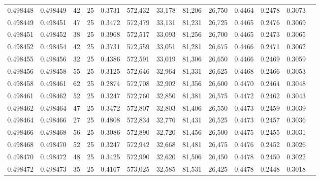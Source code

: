 \begin{tabular}{rrrrrrrrrrrrr}
0.498448 & 0.498449 &    42 &  25 &                                     0.3731 & 572,432 &  33,178 &  81,206 &  26,750 & 0.4464 & 0.2478 & 0.3073 \\
0.498449 & 0.498451 &    47 &  25 &                                     0.3472 & 572,479 &  33,131 &  81,231 &  26,725 & 0.4465 & 0.2476 & 0.3069 \\
0.498451 & 0.498452 &    38 &  25 &                                     0.3968 & 572,517 &  33,093 &  81,256 &  26,700 & 0.4465 & 0.2473 & 0.3065 \\
0.498452 & 0.498454 &    42 &  25 &                                     0.3731 & 572,559 &  33,051 &  81,281 &  26,675 & 0.4466 & 0.2471 & 0.3062 \\
0.498455 & 0.498456 &    32 &  25 &                                     0.4386 & 572,591 &  33,019 &  81,306 &  26,650 & 0.4466 & 0.2469 & 0.3059 \\
0.498456 & 0.498458 &    55 &  25 &                                     0.3125 & 572,646 &  32,964 &  81,331 &  26,625 & 0.4468 & 0.2466 & 0.3053 \\
0.498458 & 0.498461 &    62 &  25 &                                     0.2874 & 572,708 &  32,902 &  81,356 &  26,600 & 0.4470 & 0.2464 & 0.3048 \\
0.498461 & 0.498462 &    52 &  25 &                                     0.3247 & 572,760 &  32,850 &  81,381 &  26,575 & 0.4472 & 0.2462 & 0.3043 \\
0.498462 & 0.498464 &    47 &  25 &                                     0.3472 & 572,807 &  32,803 &  81,406 &  26,550 & 0.4473 & 0.2459 & 0.3039 \\
0.498464 & 0.498466 &    27 &  25 &                                     0.4808 & 572,834 &  32,776 &  81,431 &  26,525 & 0.4473 & 0.2457 & 0.3036 \\
0.498466 & 0.498468 &    56 &  25 &                                     0.3086 & 572,890 &  32,720 &  81,456 &  26,500 & 0.4475 & 0.2455 & 0.3031 \\
0.498468 & 0.498470 &    52 &  25 &                                     0.3247 & 572,942 &  32,668 &  81,481 &  26,475 & 0.4476 & 0.2452 & 0.3026 \\
0.498470 & 0.498472 &    48 &  25 &                                     0.3425 & 572,990 &  32,620 &  81,506 &  26,450 & 0.4478 & 0.2450 & 0.3022 \\
0.498472 & 0.498473 &    35 &  25 &                                     0.4167 & 573,025 &  32,585 &  81,531 &  26,425 & 0.4478 & 0.2448 & 0.3018 \\

\end{tabular}

